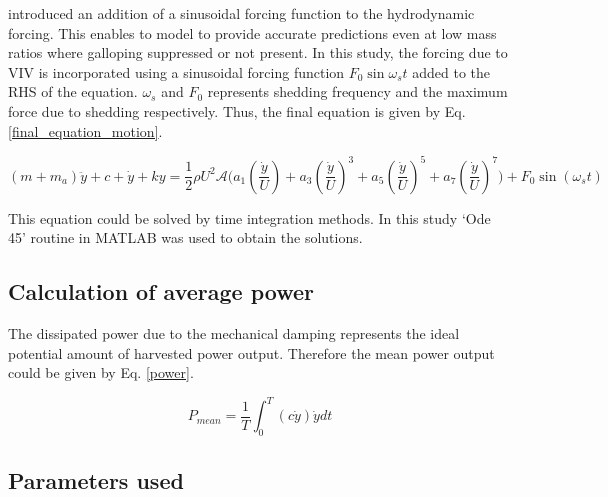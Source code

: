 \cite{Joly2012} introduced  an addition of a sinusoidal forcing function to the hydrodynamic forcing. This enables to model to provide accurate predictions even at low mass ratios where galloping  suppressed or not present. In this study, the forcing due to VIV is incorporated using a sinusoidal forcing function $F_0\sin{\omega_{s}t}$ added to the RHS of the equation. $\omega_{s}$ and $F_0$ represents shedding frequency and the maximum force due to shedding respectively. Thus, the final equation is given by Eq. \eqref{final_equation_motion}.    

\begin{equation}
\label{final_equation_motion}
(m{+}m_a)\ddot{y}{+}c{+}\dot{y}{+}ky{=}\frac{1}{2}\rho U^2 \mathcal  {A} \Bigg(a_1\left(\frac{\dot{y}}{U}\right){+}a_3\left(\frac{\dot{y}}{U}\right)^3{+}a_5\left(\frac{\dot{y}}{U}\right)^5{+}a_7\left(\frac{\dot{y}}{U}\right)^7 \Bigg){+} F_0\sin{(\omega_s t)}
\end{equation}

This equation could be solved by time integration methods. In  this study  `Ode 45' routine in MATLAB was used to obtain the solutions.

\subsection{Calculation of average power}

 The dissipated power due to the mechanical damping represents the ideal potential amount of harvested power output. Therefore the mean power output could be given by Eq. \eqref{power}. 
  
 
 \begin{equation}
 \label{power}
P_{mean}=\frac{1}{T}\int_{0}^{T}(c\dot{y})\dot{y} dt
 \end{equation}
 
 
 \vspace{20mm}
 
 
\subsection{Parameters used} 
 
